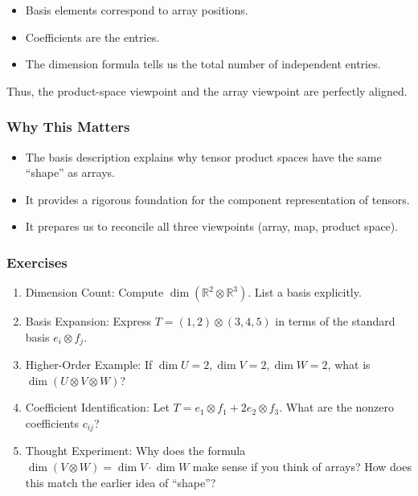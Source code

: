 \documentclass[
  letterpaper,
  DIV=11,
  numbers=noendperiod]{scrreprt}
\providecommand{\tightlist}{%
  \setlength{\itemsep}{0pt}\setlength{\parskip}{0pt}}
\begin{document}
\begin{itemize}
\tightlist
\item
  Basis elements correspond to array positions.
\item
  Coefficients are the entries.
\item
  The dimension formula tells us the total number of independent
  entries.
\end{itemize}

Thus, the product-space viewpoint and the array viewpoint are perfectly
aligned.

\subsubsection{Why This Matters}\label{why-this-matters-8}

\begin{itemize}
\tightlist
\item
  The basis description explains why tensor product spaces have the same
  ``shape'' as arrays.
\item
  It provides a rigorous foundation for the component representation of
  tensors.
\item
  It prepares us to reconcile all three viewpoints (array, map, product
  space).
\end{itemize}

\subsubsection{Exercises}\label{exercises-18}

\begin{enumerate}
\def\labelenumi{\arabic{enumi}.}
\item
  Dimension Count: Compute \(\dim(\mathbb{R}^2 \otimes \mathbb{R}^3)\).
  List a basis explicitly.
\item
  Basis Expansion: Express \(T = (1,2) \otimes (3,4,5)\) in terms of the
  standard basis \(e_i \otimes f_j\).
\item
  Higher-Order Example: If \(\dim U = 2, \dim V = 2, \dim W = 2\), what
  is \(\dim(U \otimes V \otimes W)\)?
\item
  Coefficient Identification: Let
  \(T = e_1 \otimes f_1 + 2 e_2 \otimes f_3\). What are the nonzero
  coefficients \(c_{ij}\)?
\item
  Thought Experiment: Why does the formula
  \(\dim(V \otimes W) = \dim V \cdot \dim W\) make sense if you think of
  arrays? How does this match the earlier idea of ``shape''?
\end{enumerate}
\end{document}
